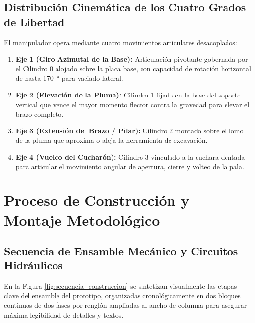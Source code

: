 \subsection{Distribución Cinemática de los Cuatro Grados de Libertad}
El manipulador opera mediante cuatro movimientos articulares desacoplados:
\begin{enumerate}
    \item \textbf{Eje 1 (Giro Azimutal de la Base):} Articulación pivotante gobernada por el Cilindro 0 alojado sobre la placa base, con capacidad de rotación horizontal de hasta \SI{170}{\degree} para vaciado lateral.
    \item \textbf{Eje 2 (Elevación de la Pluma):} Cilindro 1 fijado en la base del soporte vertical que vence el mayor momento flector contra la gravedad para elevar el brazo completo.
    \item \textbf{Eje 3 (Extensión del Brazo / Pilar):} Cilindro 2 montado sobre el lomo de la pluma que aproxima o aleja la herramienta de excavación.
    \item \textbf{Eje 4 (Vuelco del Cucharón):} Cilindro 3 vinculado a la cuchara dentada para articular el movimiento angular de apertura, cierre y volteo de la pala.
\end{enumerate}


\section{Proceso de Construcción y Montaje Metodológico}

\subsection{Secuencia de Ensamble Mecánico y Circuitos Hidráulicos}
En la Figura \ref{fig:secuencia_construccion} se sintetizan visualmente las etapas clave del ensamble del prototipo, organizadas cronológicamente en dos bloques continuos de dos fases por renglón ampliadas al ancho de columna para asegurar máxima legibilidad de detalles y textos.

